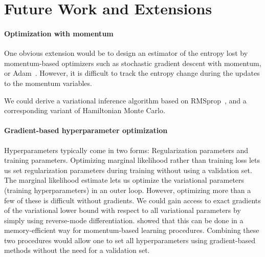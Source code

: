 \documentclass[]{article}
\begin{document}



\section{Future Work and Extensions}

\paragraph{Optimization with momentum}
One obvious extension would be to design an estimator of the entropy lost by momentum-based optimizers such as stochastic gradient descent with momentum, or Adam~\citep{Adam14}.
However, it is difficult to track the entropy change during the updates to the momentum variables.

We could derive a variational inference algorithm based on RMSprop~\cite{Tieleman2012}, and a corresponding variant of Hamiltonian Monte Carlo.

\paragraph{Gradient-based hyperparameter optimization}
Hyperparameters typically come in two forms:
Regularization parameters and training parameters.
Optimizing marginal likelihood rather than training loss lets us set regularization parameters during training without using a validation set.
The marginal likelihood estimate lets us optimize the variational parameters (training hyperparameters) in an outer loop.
However, optimizing more than a few of these is difficult without gradients.
We could gain access to exact gradients of the variational lower bound with respect to all variational parameters by simply using reverse-mode differentiation.
\citet{MacDuvAda2015hyper} showed that this can be done in a memory-efficient way for momentum-based learning procedures.
Combining these two procedures would allow one to set all hyperparameters using gradient-based methods without the need for a validation set.
\end{document}
